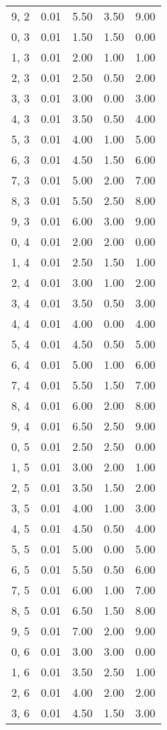 \documentclass[12pt]{article}
\begin{document}
\begin{tabular}{c || c || c | c | c}
9, 2 & 0.01 & 5.50 & 3.50 & 9.00 \\
0, 3 & 0.01 & 1.50 & 1.50 & 0.00 \\
1, 3 & 0.01 & 2.00 & 1.00 & 1.00 \\
2, 3 & 0.01 & 2.50 & 0.50 & 2.00 \\
3, 3 & 0.01 & 3.00 & 0.00 & 3.00 \\
4, 3 & 0.01 & 3.50 & 0.50 & 4.00 \\
5, 3 & 0.01 & 4.00 & 1.00 & 5.00 \\
6, 3 & 0.01 & 4.50 & 1.50 & 6.00 \\
7, 3 & 0.01 & 5.00 & 2.00 & 7.00 \\
8, 3 & 0.01 & 5.50 & 2.50 & 8.00 \\
9, 3 & 0.01 & 6.00 & 3.00 & 9.00 \\
0, 4 & 0.01 & 2.00 & 2.00 & 0.00 \\
1, 4 & 0.01 & 2.50 & 1.50 & 1.00 \\
2, 4 & 0.01 & 3.00 & 1.00 & 2.00 \\
3, 4 & 0.01 & 3.50 & 0.50 & 3.00 \\
4, 4 & 0.01 & 4.00 & 0.00 & 4.00 \\
5, 4 & 0.01 & 4.50 & 0.50 & 5.00 \\
6, 4 & 0.01 & 5.00 & 1.00 & 6.00 \\
7, 4 & 0.01 & 5.50 & 1.50 & 7.00 \\
8, 4 & 0.01 & 6.00 & 2.00 & 8.00 \\
9, 4 & 0.01 & 6.50 & 2.50 & 9.00 \\
0, 5 & 0.01 & 2.50 & 2.50 & 0.00 \\
1, 5 & 0.01 & 3.00 & 2.00 & 1.00 \\
2, 5 & 0.01 & 3.50 & 1.50 & 2.00 \\
3, 5 & 0.01 & 4.00 & 1.00 & 3.00 \\
4, 5 & 0.01 & 4.50 & 0.50 & 4.00 \\
5, 5 & 0.01 & 5.00 & 0.00 & 5.00 \\
6, 5 & 0.01 & 5.50 & 0.50 & 6.00 \\
7, 5 & 0.01 & 6.00 & 1.00 & 7.00 \\
8, 5 & 0.01 & 6.50 & 1.50 & 8.00 \\
9, 5 & 0.01 & 7.00 & 2.00 & 9.00 \\
0, 6 & 0.01 & 3.00 & 3.00 & 0.00 \\
1, 6 & 0.01 & 3.50 & 2.50 & 1.00 \\
2, 6 & 0.01 & 4.00 & 2.00 & 2.00 \\
3, 6 & 0.01 & 4.50 & 1.50 & 3.00 \\

\end{tabular}
\end{document}
